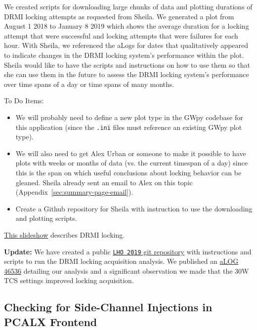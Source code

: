 \documentclass{article}
\newcommand*{\TODO}{\textcolor{todo}}
\begin{document}
We created scripts for downloading large chunks of data and plotting durations of DRMI locking attempts as requested from Sheila. We generated a plot from August 1 2018 to January 8 2019 which shows the average duration for a locking attempt that were successful and locking attempts that were failures for each hour. With Sheila, we referenced the aLogs for dates that qualitatively appeared to indicate changes in the DRMI locking system's performance within the plot. Sheila would like to have the scripts and instructions on how to use them so that she can use them in the future to assess the DRMI locking system's performance over time spans of a day or time spans of many months.

To Do Items:

\begin{itemize}
    \item \TODO{We will probably need to define a new plot type in the GWpy codebase for this application (since the \texttt{.ini} files must reference an existing GWpy plot type).}
    \item \TODO{We will also need to get Alex Urban or someone to make it possible to have plots with weeks or months of data (vs. the current timespan of a day) since this is the span on which useful conclusions about locking behavior can be gleaned. Sheila already sent an email to Alex on this topic (Appendix~\ref{sec:summary-page-email}).}
    \item Create a Github repository for Sheila with instruction to use the downloading and plotting scripts.
\end{itemize}
\href{https://dcc.ligo.org/LIGO-G1301236}{This slideshow} describes DRMI locking.

\textbf{Update:} We have created a public  \href{https://github.com/ysa2106/LHO_2019}{\texttt{LHO 2019} git repository} with instructions and scripts to run the DRMI locking acquisition analysis. We published an \href{https://alog.ligo-wa.caltech.edu/aLOG/index.php?callRep=46536}{aLOG 46536} detailing our analysis and a significant observation we made that the 30W TCS settings improved locking acquisition.

\TODO{\subsection{Checking for Side-Channel Injections in PCALX Frontend}
}
\end{document}
